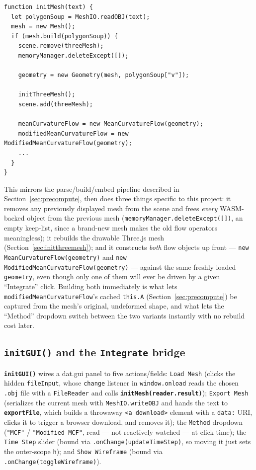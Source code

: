 \documentclass[11pt]{article}
\newcommand{\code}[1]{\texttt{#1}}
\newcommand{\func}[1]{\texttt{\textbf{#1}}}
\begin{document}
\begin{lstlisting}
function initMesh(text) {
  let polygonSoup = MeshIO.readOBJ(text);
  mesh = new Mesh();
  if (mesh.build(polygonSoup)) {
    scene.remove(threeMesh);
    memoryManager.deleteExcept([]);

    geometry = new Geometry(mesh, polygonSoup["v"]);

    initThreeMesh();
    scene.add(threeMesh);

    meanCurvatureFlow = new MeanCurvatureFlow(geometry);
    modifiedMeanCurvatureFlow = new ModifiedMeanCurvatureFlow(geometry);
    ...
  }
}
\end{lstlisting}
This mirrors the parse/build/embed pipeline described in Section~\ref{sec:precompute}, then
does three things specific to this project: it removes any previously displayed mesh from
the scene and frees \emph{every} WASM-backed object from the previous mesh
(\code{memoryManager.deleteExcept([])}, an empty keep-list, since a brand-new mesh makes the
old flow operators meaningless); it rebuilds the drawable Three.js mesh
(Section~\ref{sec:initthreemesh}); and it constructs \emph{both} flow objects up front ---
\code{new MeanCurvatureFlow(geometry)} and \code{new ModifiedMeanCurvatureFlow(geometry)}
--- against the same freshly loaded \code{geometry}, even though only one of them will ever
be driven by a given ``Integrate'' click. Building both immediately is what lets
\code{modifiedMeanCurvatureFlow}'s cached \code{this.A} (Section~\ref{sec:precompute}) be
captured from the mesh's original, undeformed shape, and what lets the ``Method'' dropdown
switch between the two variants instantly with no rebuild cost later.

\subsection{\func{initGUI()} and the \code{Integrate} bridge}
\label{sec:bridge}
\func{initGUI()} wires a dat.gui panel to five actions/fields: \code{Load Mesh} (clicks
the hidden \code{fileInput}, whose \code{change} listener in \code{window.onload} reads the
chosen \code{.obj} file with a \code{FileReader} and calls
\func{initMesh(reader.result)}); \code{Export Mesh} (serializes the current mesh with
\code{MeshIO.writeOBJ} and hands the text to \func{exportFile}, which builds a throwaway
\code{<a download>} element with a \code{data:} URI, clicks it to trigger a browser
download, and removes it); the \code{Method} dropdown (\code{"MCF"} / \code{"Modified
MCF"}, read --- not reactively watched --- at click time); the \code{Time Step} slider
(bound via \code{.onChange(updateTimeStep)}, so moving it just sets the outer-scope
\code{h}); and \code{Show Wireframe} (bound via \code{.onChange(toggleWireframe)}).
\end{document}
